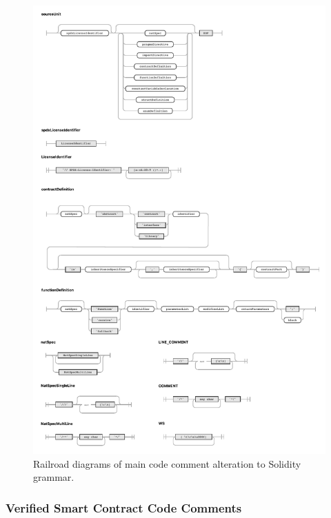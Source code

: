 \begin{figure}[htbp]
    \centering
    \includegraphics[width=\textwidth]{figures/solidity-comments-railroad-diagram.pdf}
    \caption{Railroad diagrams of main code comment alteration to Solidity grammar.}
    \label{fig:solidity-railroad-diagram}
\end{figure}


\subsubsection{Verified Smart Contract Code Comments}
\label{sec:verified-smart-contract-code-comments}


